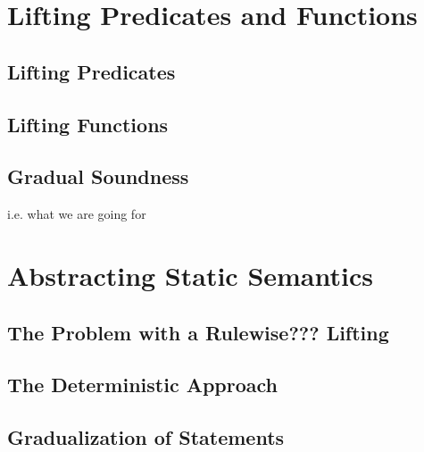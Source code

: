 
\section{Lifting Predicates and Functions}
\label{sec:lifting-predicates-and}


    \subsection{Lifting Predicates}
    \label{ssec:lifting-predicates}
    
    
    \subsection{Lifting Functions}
    \label{ssec:lifting-functions}
    
    
    \subsection{Gradual Soundness}
    i.e. what we are going for

\section{Abstracting Static Semantics}
\label{sec:abstracting-static-semantics}


    \subsection{The Problem with a Rulewise??? Lifting}
    \label{ssec:the-problem-with}
    
    
    \subsection{The Deterministic Approach}
    \label{ssec:the-deterministic-approach}
    
    
    \subsection{Gradualization of Statements}

